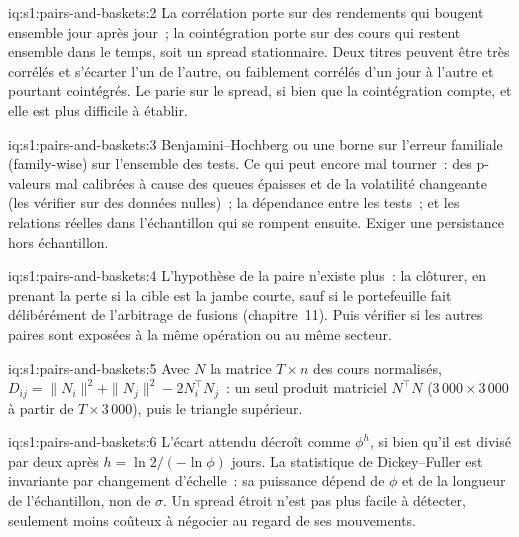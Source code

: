 \begin{solution}{iq:s1:pairs-and-baskets:2}
La corrélation porte sur des rendements qui bougent ensemble jour après jour~; la cointégration porte sur des cours qui restent ensemble dans le temps, soit un spread stationnaire. Deux titres peuvent être
très corrélés et s'écarter l'un de l'autre, ou faiblement corrélés d'un jour à l'autre et pourtant cointégrés. Le  parie sur le spread, si bien que la cointégration compte,
et elle est plus difficile à établir.
\end{solution}

\begin{solution}{iq:s1:pairs-and-baskets:3}
Benjamini--Hochberg ou une borne sur l'erreur familiale (family-wise) sur l'ensemble des tests. Ce qui peut encore mal tourner~: des p-valeurs mal calibrées à cause des queues épaisses et de la volatilité changeante (les vérifier sur
des données nulles)~; la dépendance entre les tests~; et les relations réelles dans l'échantillon qui se rompent ensuite. Exiger une persistance hors échantillon.
\end{solution}

\begin{solution}{iq:s1:pairs-and-baskets:4}
L'hypothèse de la paire n'existe plus~: la clôturer, en prenant la perte si la cible est la jambe courte, sauf si le portefeuille fait délibérément de l'arbitrage de fusions (chapitre~11). Puis
vérifier si les autres paires sont exposées à la même opération ou au même secteur.
\end{solution}

\begin{solution}{iq:s1:pairs-and-baskets:5}
Avec $N$ la matrice $T \times n$ des cours normalisés, $D_{ij} = \|N_i\|^2 + \|N_j\|^2 - 2 N_i^\top N_j$~: un seul produit matriciel $N^\top N$ ($3\,000 \times
3\,000$ à partir de $T \times 3\,000$), puis le triangle supérieur.
\end{solution}

\begin{solution}{iq:s1:pairs-and-baskets:6}
L'écart attendu décroît comme $\phi^h$, si bien qu'il est divisé par deux après $h = \ln 2/(-\ln\phi)$ jours. La statistique de Dickey--Fuller est invariante par changement d'échelle~: sa puissance
dépend de $\phi$ et de la longueur de l'échantillon, non de $\sigma$. Un spread étroit n'est pas plus facile à détecter, seulement moins coûteux à négocier au regard de ses mouvements.
\end{solution}

